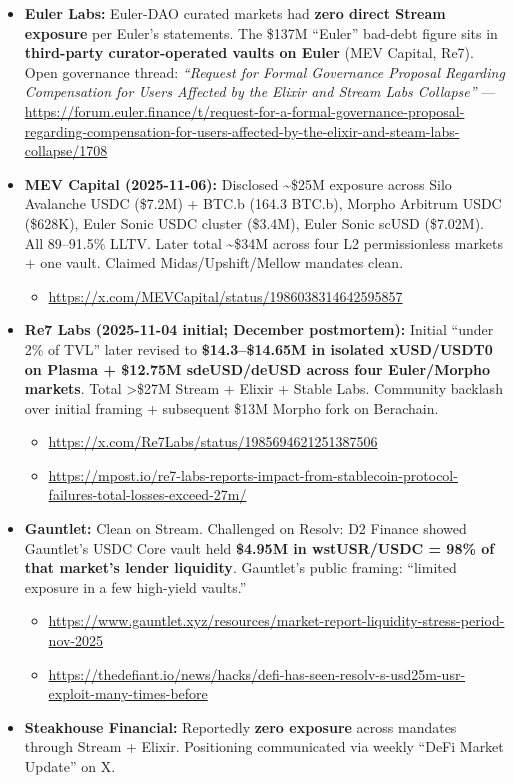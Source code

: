 \begin{itemize}
\item
  \textbf{Euler Labs:} Euler-DAO curated markets had \textbf{zero direct Stream exposure} per Euler's statements. The \$137M ``Euler'' bad-debt figure sits in \textbf{third-party curator-operated vaults on Euler} (MEV Capital, Re7). Open governance thread: \emph{``Request for Formal Governance Proposal Regarding Compensation for Users Affected by the Elixir and Stream Labs Collapse''} --- \url{https://forum.euler.finance/t/request-for-a-formal-governance-proposal-regarding-compensation-for-users-affected-by-the-elixir-and-steam-labs-collapse/1708}
\item
  \textbf{MEV Capital (2025-11-06):} Disclosed \textasciitilde\$25M exposure across Silo Avalanche USDC (\$7.2M) + BTC.b (164.3 BTC.b), Morpho Arbitrum USDC (\$628K), Euler Sonic USDC cluster (\$3.4M), Euler Sonic scUSD (\$7.02M). All 89--91.5\% LLTV. Later total \textasciitilde\$34M across four L2 permissionless markets + one vault. Claimed Midas/Upshift/Mellow mandates clean.

  \begin{itemize}
  \tightlist
  \item
    \url{https://x.com/MEVCapital/status/1986038314642595857}
  \end{itemize}
\item
  \textbf{Re7 Labs (2025-11-04 initial; December postmortem):} Initial ``under 2\% of TVL'' later revised to \textbf{\$14.3--\$14.65M in isolated xUSD/USDT0 on Plasma + \$12.75M sdeUSD/deUSD across four Euler/Morpho markets}. Total \textgreater\$27M Stream + Elixir + Stable Labs. Community backlash over initial framing + subsequent \$13M Morpho fork on Berachain.

  \begin{itemize}
  \tightlist
  \item
    \url{https://x.com/Re7Labs/status/1985694621251387506}
  \item
    \url{https://mpost.io/re7-labs-reports-impact-from-stablecoin-protocol-failures-total-losses-exceed-27m/}
  \end{itemize}
\item
  \textbf{Gauntlet:} Clean on Stream. Challenged on Resolv: D2 Finance showed Gauntlet's USDC Core vault held \textbf{\$4.95M in wstUSR/USDC = 98\% of that market's lender liquidity}. Gauntlet's public framing: ``limited exposure in a few high-yield vaults.''

  \begin{itemize}
  \tightlist
  \item
    \url{https://www.gauntlet.xyz/resources/market-report-liquidity-stress-period-nov-2025}
  \item
    \url{https://thedefiant.io/news/hacks/defi-has-seen-resolv-s-usd25m-usr-exploit-many-times-before}
  \end{itemize}
\item
  \textbf{Steakhouse Financial:} Reportedly \textbf{zero exposure} across mandates through Stream + Elixir. Positioning communicated via weekly ``DeFi Market Update'' on X.


\end{itemize}
